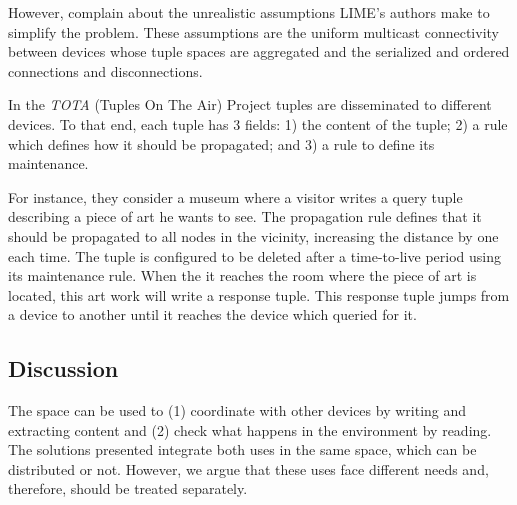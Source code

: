 However, \citet{coulouris_distributed_2012} complain about the unrealistic assumptions LIME's authors make to simplify the problem. %
These assumptions are the uniform multicast connectivity between devices whose tuple spaces are aggregated and the serialized and ordered connections and disconnections.


In the \emph{TOTA} (Tuples On The Air) Project \citep{mamei_programming_2009} tuples are disseminated to different devices.
To that end, each tuple has 3 fields:
1) the content of the tuple;
2) a rule which defines how it should be propagated; and
3) a rule to define its maintenance.

For instance, they consider a museum where a visitor writes a query tuple describing a piece of art he wants to see.
The propagation rule defines that it should be propagated to all nodes in the vicinity, increasing the distance by one each time.
The tuple is configured to be deleted after a time-to-live period using its maintenance rule.
When the it reaches the room where the piece of art is located, this art work will write a response tuple.
This response tuple jumps from a device to another until it reaches the device which queried for it.






\subsection{Discussion}

The space can be used to
(1) coordinate with other devices by writing and extracting content and
(2) check what happens in the environment by reading.
The solutions presented integrate both uses in the same space, which can be distributed or not.
However, we argue that these uses face different needs and, therefore, should be treated separately.



